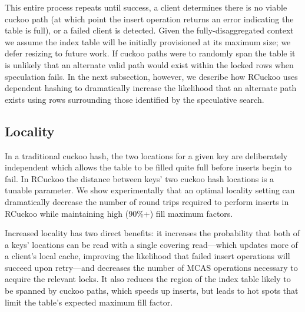 This entire process repeats until success, a client determines there
is no viable cuckoo path (at which point the insert operation returns
an error indicating the table is full), or a failed client is detected.  Given the fully-disaggregated
context we assume the index table will be initially provisioned at its
maximum size; we defer resizing to future work.
If cuckoo paths were to randomly span the table it is unlikely that an
alternate valid path would exist within the locked rows when
speculation fails.  In the next subsection, however, we describe how
RCuckoo uses dependent hashing to dramatically increase the likelihood
that an alternate path exists using rows surrounding those identified
by the speculative search.






\subsection{Locality}



In a traditional cuckoo hash, the two locations for a given key are
deliberately independent which allows the table to be filled quite
full before inserts begin to fail. 
%
In RCuckoo the distance between keys' two cuckoo hash locations is a
tunable parameter.
We show experimentally that an optimal locality
setting can dramatically decrease the number of round trips required
to perform inserts in RCuckoo while maintaining high (90\%+) fill
maximum factors.

Increased locality has two direct benefits: it
increases the probability that both of a keys' locations can be read
with a single covering read---which updates more of a client's local
cache, improving the likelihood that failed insert operations will
succeed upon retry---and decreases the number of MCAS operations
necessary to acquire the relevant locks.  It also reduces the region
of the index table likely to be spanned by cuckoo paths, which speeds
up inserts, but leads to hot spots that limit the table's expected
maximum fill factor.  


